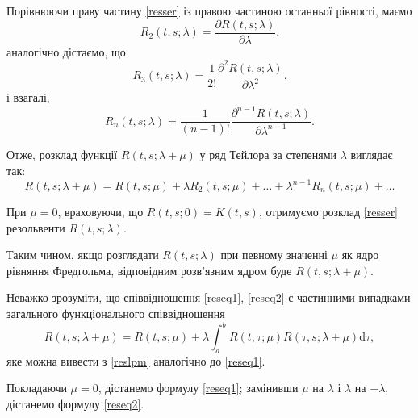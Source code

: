 \documentclass[14pt,twoside]{extreport}
\theoremstyle{mystyle}
\numberwithin{equation}{chapter}
\begin{document}
Порівнюючи праву частину \eqref{resser} із правою частиною останньої рівності, маємо
\[
 R_2(t, s; \lambda) = \frac{\partial R(t, s; \lambda)}{\partial \lambda}.
\]
аналогічно дістаємо, що
\[
 R_3(t, s; \lambda) = \frac{1}{2!} \frac{\partial^2 R(t, s; \lambda)}{\partial \lambda^2}.
\]
і взагалі,
\[
 R_n(t, s; \lambda) = \frac{1}{(n-1)!} \frac{\partial^{n-1} R(t, s; \lambda)}{\partial \lambda^{n-1}}.
\]

Отже, розклад функції $R(t, s; \lambda + \mu)$ у ряд Тейлора за степенями $\lambda$ виглядає так:
\begin{equation}\label{reslpm}
 R(t, s; \lambda + \mu)= R(t,s; \mu) + \lambda R_2(t, s; \mu) + \ldots + \lambda^{n-1}R_n(t, s; \mu)+\ldots
\end{equation}

При $\mu = 0$, враховуючи, що $R(t, s; 0) = K(t, s)$, отримуємо розклад \eqref{resser} резольвенти $R(t, s; \lambda)$.

Таким чином, якщо розглядати $R(t, s; \lambda)$ при певному значенні $\mu$ як ядро рівняння Фредгольма, відповідним розв'язним ядром буде $R(t, s; \lambda+\mu)$.

Неважко зрозуміти, що співвідношення \eqref{reseq1}, \eqref{reseq2} є частинними випадками загального функціонального співвідношення
\begin{equation}\label{reseqlpm}
 R(t, s; \lambda+\mu)= R(t, s; \mu) + \lambda \int_{a}^{b} R(t, \tau; \mu) R(\tau, s; \lambda+\mu) \mathrm{d}\tau,
\end{equation}
яке можна вивести з \eqref{reslpm} аналогічно до \eqref{reseq1}.

Покладаючи $\mu = 0$, дістанемо формулу \eqref{reseq1}; замінивши $\mu$ на $\lambda$ і $\lambda$ на $-\lambda$, дістанемо формулу \eqref{reseq2}.
\end{document}
